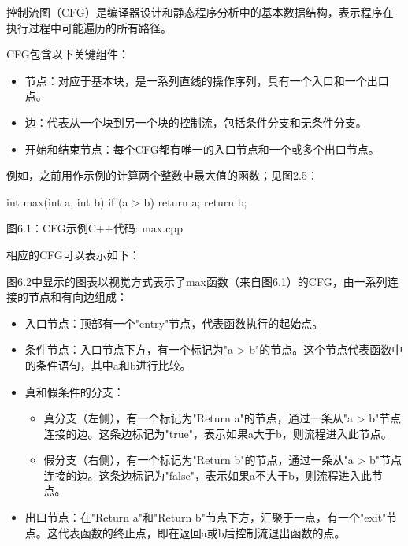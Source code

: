 控制流图（CFG）是编译器设计和静态程序分析中的基本数据结构，表示程序在执行过程中可能遍历的所有路径。

CFG包含以下关键组件：

\begin{itemize}
\item
节点：对应于基本块，是一系列直线的操作序列，具有一个入口和一个出口点。

\item
边：代表从一个块到另一个块的控制流，包括条件分支和无条件分支。

\item
开始和结束节点：每个CFG都有唯一的入口节点和一个或多个出口节点。
\end{itemize}

例如，之前用作示例的计算两个整数中最大值的函数；见图2.5：

\begin{cpp}
int max(int a, int b) {
  if (a > b)
    return a;
  return b;
}
\end{cpp}

\begin{center}
图6.1：CFG示例C++代码: max.cpp
\end{center}

相应的CFG可以表示如下：


图6.2中显示的图表以视觉方式表示了max函数（来自图6.1）的CFG，由一系列连接的节点和有向边组成：

\begin{itemize}
\item
入口节点：顶部有一个"entry"节点，代表函数执行的起始点。

\item
条件节点：入口节点下方，有一个标记为"a > b"的节点。这个节点代表函数中的条件语句，其中a和b进行比较。

\item
真和假条件的分支：
\begin{itemize}
\item
真分支（左侧），有一个标记为"Return a"的节点，通过一条从"a > b"节点连接的边。这条边标记为"true"，表示如果a大于b，则流程进入此节点。

\item
假分支（右侧），有一个标记为"Return b"的节点，通过一条从"a > b"节点连接的边。这条边标记为"false"，表示如果a不大于b，则流程进入此节点。
\end{itemize}

\item
出口节点：在"Return a"和"Return b"节点下方，汇聚于一点，有一个"exit"节点。这代表函数的终止点，即在返回a或b后控制流退出函数的点。
\end{itemize}

